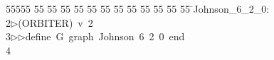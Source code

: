 %
%
\begin{tabbing}
55555 \= 55 \= 55 \= 55 \= 55 \= 55 \= 55 \= 55 \= 55 \= 55 \= 55 \= 55 \= 55 \= \>Johnson\_6\_2\_0:\\[0pt]
2\>$\triangleright$\>(ORBITER)\ v\ 2\ \\[0pt]
3\>$\triangleright$\>$\triangleright$\>define\ G\ graph\ Johnson\ 6\ 2\ 0\ end\\[0pt]
4\>\end{tabbing}
